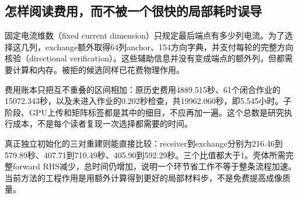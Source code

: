 \subsection{怎样阅读费用，而不被一个很快的局部耗时误导}
固定电流维数（fixed current dimension）只规定最后端点有多少列电流。为了选择这几列，exchange额外取得64列anchor、154方向字典，并支付每轮的完整方向核验（directional verification）。这些辅助信息并没有变成端点的额外列，但都需要计算和内存。被拒的候选同样已花费物理作用。

费用账本只把互不重叠的区间相加：原历史费用4889.515秒、61个闭合作业的15072.343秒，以及未进入作业的0.202秒检查，共19962.060秒，即5.545小时。子阶段、GPU上传和矩阵标签都是其中的细目，不应再加一遍。这个总数是研究执行成本，不是每个读者复现一次选择都需要的时间。

真正独立初始化的三对重建则能直接比较：receiver到exchange分别为216.46到579.89秒、407.71到710.49秒、405.90到592.29秒。三个比值都大于1。壳体所需完整forward RHS减少，总时间仍增加，说明一个环节省工作不等于整条流程加速。当前方法的工程作用是用额外计算得到更好的局部材料步，不是免费提高成像质量。
